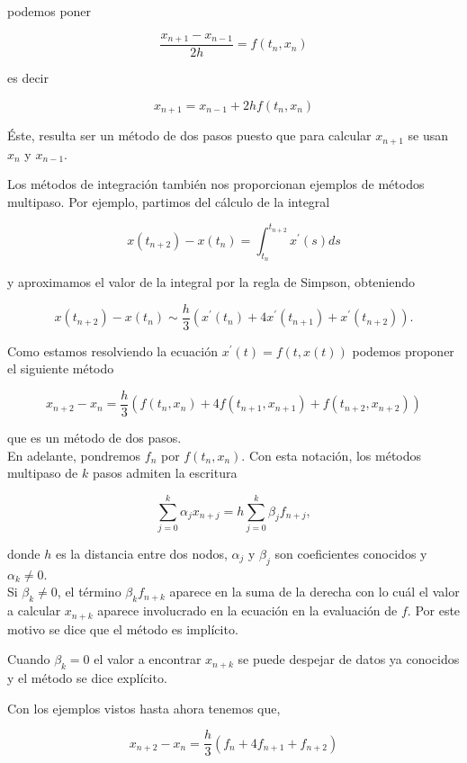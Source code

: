 \documentclass[10pt]{book}
\begin{document}
podemos poner

$$
\frac{x_{n+1}-x_{n-1}}{2 h}=f\left(t_{n}, x_{n}\right)
$$

es decir

$$
x_{n+1}=x_{n-1}+2 h f\left(t_{n}, x_{n}\right)
$$

Éste, resulta ser un método de dos pasos puesto que para calcular $x_{n+1}$ se usan $x_{n}$ y $x_{n-1}$.

Los métodos de integración también nos proporcionan ejemplos de métodos multipaso. Por ejemplo, partimos del cálculo de la integral

$$
x\left(t_{n+2}\right)-x\left(t_{n}\right)=\int_{t_{n}}^{t_{n+2}} x^{\prime}(s) d s
$$

y aproximamos el valor de la integral por la regla de Simpson, obteniendo

$$
x\left(t_{n+2}\right)-x\left(t_{n}\right) \sim \frac{h}{3}\left(x^{\prime}\left(t_{n}\right)+4 x^{\prime}\left(t_{n+1}\right)+x^{\prime}\left(t_{n+2}\right)\right) .
$$

Como estamos resolviendo la ecuación $x^{\prime}(t)=f(t, x(t))$ podemos proponer el siguiente método

$$
x_{n+2}-x_{n}=\frac{h}{3}\left(f\left(t_{n}, x_{n}\right)+4 f\left(t_{n+1}, x_{n+1}\right)+f\left(t_{n+2}, x_{n+2}\right)\right)
$$

que es un método de dos pasos.\\
En adelante, pondremos $f_{n}$ por $f\left(t_{n}, x_{n}\right)$. Con esta notación, los métodos multipaso de $k$ pasos admiten la escritura


\begin{equation*}
\sum_{j=0}^{k} \alpha_{j} x_{n+j}=h \sum_{j=0}^{k} \beta_{j} f_{n+j}, \tag{8.22}
\end{equation*}


donde $h$ es la distancia entre dos nodos, $\alpha_{j}$ y $\beta_{j}$ son coeficientes conocidos y $\alpha_{k} \neq 0$.\\
Si $\beta_{k} \neq 0$, el término $\beta_{k} f_{n+k}$ aparece en la suma de la derecha con lo cuál el valor a calcular $x_{n+k}$ aparece involucrado en la ecuación en la evaluación de $f$. Por este motivo se dice que el método es implícito.

Cuando $\beta_{k}=0$ el valor a encontrar $x_{n+k}$ se puede despejar de datos ya conocidos y el método se dice explícito.

Con los ejemplos vistos hasta ahora tenemos que,


\begin{equation*}
x_{n+2}-x_{n}=\frac{h}{3}\left(f_{n}+4 f_{n+1}+f_{n+2}\right) \tag{8.23}
\end{equation*}
\end{document}
